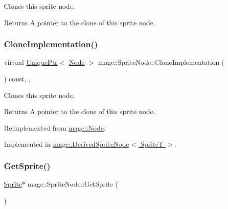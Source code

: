 Clones this sprite node.

\begin{DoxyReturn}{Returns}
A pointer to the clone of this sprite node. 
\end{DoxyReturn}
\hypertarget{classmage_1_1_sprite_node_a83a2a865b38670d64491a1066895e218}{}\label{classmage_1_1_sprite_node_a83a2a865b38670d64491a1066895e218} 
\subsubsection{\texorpdfstring{Clone\+Implementation()}{CloneImplementation()}}
{\footnotesize\ttfamily virtual \hyperlink{namespacemage_a3316d7143a973e37adf1110f2e80ca31}{Unique\+Ptr}$<$ \hyperlink{classmage_1_1_node}{Node} $>$ mage\+::\+Sprite\+Node\+::\+Clone\+Implementation (\begin{DoxyParamCaption}{ }\end{DoxyParamCaption}) const\hspace{0.3cm}{\ttfamily [override]}, {\ttfamily [private]}, {}}

Clones this sprite node.

\begin{DoxyReturn}{Returns}
A pointer to the clone of this sprite node. 
\end{DoxyReturn}


Reimplemented from \hyperlink{classmage_1_1_node_a71a4763bfd4cba5653488b490e61dc8f}{mage\+::\+Node}.



Implemented in \hyperlink{classmage_1_1_derived_sprite_node_ae1aa2b80d4ff8688635df017826c11a5}{mage\+::\+Derived\+Sprite\+Node$<$ Sprite\+T $>$}.

\hypertarget{classmage_1_1_sprite_node_a84806dd38c94900f0fabf0163a706370}{}\label{classmage_1_1_sprite_node_a84806dd38c94900f0fabf0163a706370} 
\subsubsection{\texorpdfstring{Get\+Sprite()}{GetSprite()}\hspace{0.1cm}{\footnotesize\ttfamily [1/2]}}
{\footnotesize\ttfamily \hyperlink{classmage_1_1_sprite}{Sprite}$\ast$ mage\+::\+Sprite\+Node\+::\+Get\+Sprite (\begin{DoxyParamCaption}{ }\end{DoxyParamCaption})\hspace{0.3cm}{\ttfamily [noexcept]}}

